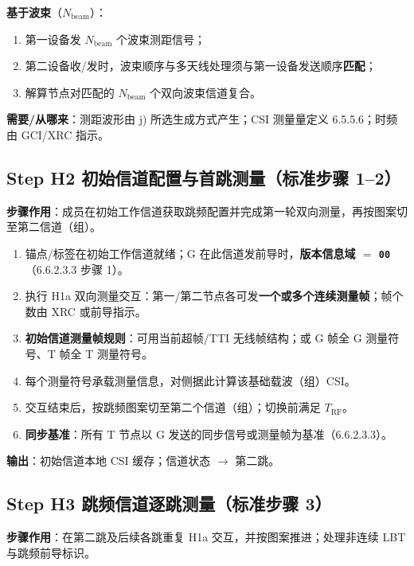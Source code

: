 \documentclass[11pt,a4paper]{ctexart}
\begin{document}
\textbf{基于波束}（$N_{\mathrm{beam}}$）：
\begin{enumerate}[nosep]
  \item 第一设备发 $N_{\mathrm{beam}}$ 个波束测距信号；
  \item 第二设备收/发时，波束顺序与多天线处理须与第一设备发送顺序\textbf{匹配}；
  \item 解算节点对匹配的 $N_{\mathrm{beam}}$ 个双向波束信道复合。
\end{enumerate}

\textbf{需要/从哪来}：测距波形由 j) 所选生成方式产生；CSI 测量量定义 6.5.5.6；时频由 GCI/XRC 指示。

\subsection{Step H2 初始信道配置与首跳测量（标准步骤 1--2）}

\textbf{步骤作用}：成员在初始工作信道获取跳频配置并完成第一轮双向测量，再按图案切至第二信道（组）。

\begin{enumerate}
  \item 锚点/标签在初始工作信道就绪；G 在此信道发前导时，\textbf{版本信息域 $=$ \texttt{00}}（6.6.2.3.3 步骤 1）。
  \item 执行 H1a 双向测量交互：第一/第二节点各可发\textbf{一个或多个连续测量帧}；帧个数由 XRC 或前导指示。
  \item \textbf{初始信道测量帧规则}：可用当前超帧/TTI 无线帧结构；或 G 帧全 G 测量符号、T 帧全 T 测量符号。
  \item 每个测量符号承载测量信息，对侧据此计算该基础载波（组）CSI。
  \item 交互结束后，按跳频图案切至第二个信道（组）；切换前满足 $T_{\mathrm{RF}}$。
  \item \textbf{同步基准}：所有 T 节点以 G 发送的同步信号或测量帧为基准（6.6.2.3.3）。
\end{enumerate}

\textbf{输出}：初始信道本地 CSI 缓存；信道状态 $\rightarrow$ 第二跳。

\subsection{Step H3 跳频信道逐跳测量（标准步骤 3）}

\textbf{步骤作用}：在第二跳及后续各跳重复 H1a 交互，并按图案推进；处理非连续 LBT 与跳频前导标识。
\end{document}
